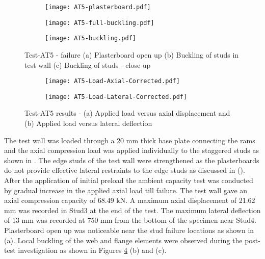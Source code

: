 \begin{figure}[!htbp]
	\centering
	\begin{subfigure}[b]{0.4\textwidth}
		\centering
		\texttt{[image: AT5-plasterboard.pdf]}
		\caption{}
		\label{subfig:AT5-full-buckling}
	\end{subfigure}
	\begin{subfigure}[b]{0.5\textwidth}
		\centering
		\texttt{[image: AT5-full-buckling.pdf]}
		\caption{}
		\label{subfig:AT5-plasterboard}
	\end{subfigure}
	\begin{subfigure}[b]{0.45\textwidth}
		\centering
		\texttt{[image: AT5-buckling.pdf]}
		\caption{}
		\label{subfig:AT5-buckling}
	\end{subfigure}
	   \caption{Test-AT5 - failure (a) Plasterboard open up  (b) Buckling of studs in test wall (c) Buckling of studs - close up }
	   \label{fig:AT5-failure}
\end{figure}
\begin{figure}[!htbp]
	\centering
	\begin{subfigure}[b]{0.7\textwidth}
		\centering
		\texttt{[image: AT5-Load-Axial-Corrected.pdf]}
		\caption{}
		\label{subfig:AT5-Load-Axial-Corrected}
	\end{subfigure}
	\begin{subfigure}[b]{0.7\textwidth}
		\centering
		\texttt{[image: AT5-Load-Lateral-Corrected.pdf]}
		\caption{}
		\label{subfig:AT5-Load-Lateral-Corrected}
	\end{subfigure}
	   \caption{Test-AT5 results - (a) Applied load versus axial displacement and (b) Applied load versus lateral deflection}
	   \label{fig:AT5-results}
\end{figure}

The test wall was loaded through a 20 mm thick base plate connecting the rams and the axial compression load was applied individually to the staggered studs as shown in . The edge studs of the test wall were strengthened as the plasterboards do not provide effective lateral restraints to the edge studs as discussed in  (). After the application of initial preload the ambient capacity test was conducted by gradual increase in the applied axial load till failure. The test wall gave an axial compression capacity of 68.49 kN. A maximum axial displacement of 21.62 mm was recorded in Stud3 at the end of the test. The maximum lateral deflection of 13 mm was recorded at 750 mm from the bottom of the specimen near Stud4. Plasterboard open up was noticeable near the stud failure locations as shown in  (a). Local buckling of the web and flange elements were observed during the post-test investigation as shown in Figures \ref{fig:AT5-failure} (b) and (c).

